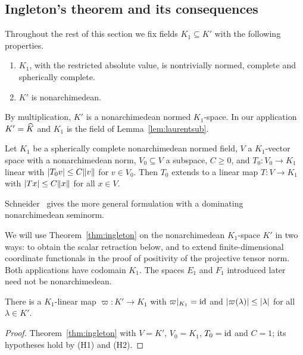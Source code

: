 \subsection{Ingleton's theorem and its consequences}
Throughout the rest of this section we fix fields $K_1\subseteq K'$ with the following properties.
\begin{enumerate}
\item[(H1)] $K_1$, with the restricted absolute value, is nontrivially normed, complete and spherically complete.
\item[(H2)] $K'$ is nonarchimedean.
\end{enumerate}
By multiplication, $K'$ is a nonarchimedean normed $K_1$\nobreakdash-space. In our application $K'=\widehat K$ and $K_1$ is the field of
Lemma~\ref{lem:laurentsub}.

\begin{theorem}\label{thm:ingleton}
Let $K_1$ be a spherically complete nonarchimedean normed field, $V$ a $K_1$\nobreakdash-vector space with a nonarchimedean norm,
$V_0\subseteq V$ a subspace, $C\ge0$, and $T_0\colon V_0\to K_1$ linear with $\lvert T_0v\rvert\le C\lVert v\rVert$ for $v\in V_0$. Then
$T_0$ extends to a linear map $T\colon V\to K_1$ with $\lvert Tx\rvert\le C\lVert x\rVert$ for all $x\in V$.
\end{theorem}

Schneider~\cite[Prop.~9.2]{Sch} gives the more general formulation with a dominating nonarchimedean seminorm.

We will use Theorem~\ref{thm:ingleton} on the nonarchimedean $K_1$\nobreakdash-space $K'$ in two ways: to obtain the scalar
retraction below, and to extend finite-dimensional coordinate functionals in the proof of positivity of the
projective tensor norm. Both applications have codomain $K_1$. The spaces $E_1$ and $F_1$ introduced later need not
be nonarchimedean.

\begin{corollary}\label{cor:proj}
There is a $K_1$\nobreakdash-linear map $\varpi\colon K'\to K_1$ with $\varpi|_{K_1}=\mathrm{id}$ and $\lvert \varpi(\lambda)\rvert\le\lvert \lambda\rvert$ for all
$\lambda\in K'$.
\end{corollary}

\begin{proof}
Theorem~\ref{thm:ingleton} with $V=K'$, $V_0=K_1$, $T_0=\mathrm{id}$ and $C=1$; its hypotheses hold by (H1) and (H2).
\end{proof}


